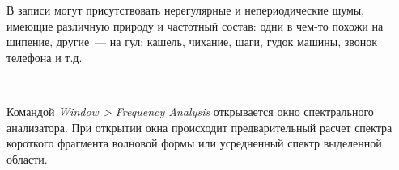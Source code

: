 \documentclass{beamer}
\begin{document}
\begin{frame}
В записи могут присутствовать нерегулярные и непериодические шумы, имеющие различную природу и частотный состав: одни в чем-то похожи на шипение, другие~--- на гул: кашель, чихание, шаги, гудок машины, звонок телефона и т.д. 


~

\end{frame}

\begin{frame}
Командой \textit{Window > Frequency Analysis} открывается окно спектрального анализатора. При открытии окна происходит предварительный расчет спектра короткого фрагмента волновой формы или усредненный спектр выделенной области.

~

\end{frame}
\end{document}
